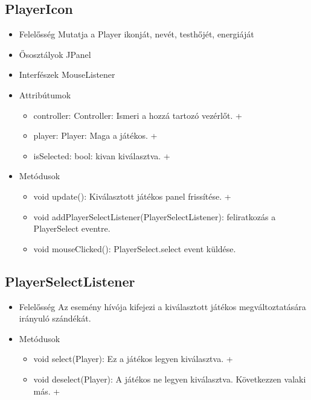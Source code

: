 \subsection{PlayerIcon}
\begin{itemize}
	\item Felelősség\newline
	Mutatja a Player ikonját, nevét, testhőjét, energiáját
	\item Ősosztályok\newline
	JPanel
	\item Interfészek\newline
	MouseListener
	\item Attribútumok\newline
	\begin{itemize}
		\item controller: Controller: Ismeri a hozzá tartozó vezérlőt. +	
		\item player: Player: Maga a játékos. +
		\item isSelected: bool: kivan kiválasztva. +
	\end{itemize}
	\item Metódusok\newline
	\begin{itemize}
		\item void update(): Kiválasztott játékos panel frissítése. +
		\item void addPlayerSelectListener(PlayerSelectListener): feliratkozás a PlayerSelect eventre.
		\item void mouseClicked(): PlayerSelect.select event küldése.
	\end{itemize}
\end{itemize}

\subsection{PlayerSelectListener}
\begin{itemize}
	\item Felelősség\newline
	Az esemény hívója kifejezi a kiválasztott játékos megváltoztatására irányuló szándékát.
	\item Metódusok\newline
	\begin{itemize}
		\item void select(Player): Ez a játékos legyen kiválasztva. +
		\item void deselect(Player): A játékos ne legyen kiválasztva. Következzen valaki más. +
	\end{itemize}
\end{itemize}

